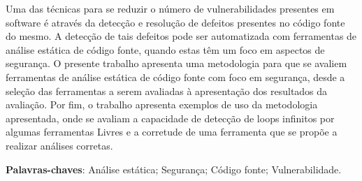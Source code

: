 \begin{resumo}

Uma das técnicas para se reduzir o número de vulnerabilidades presentes em
software é através da detecção e resolução de defeitos presentes no código fonte
do mesmo. A detecção de tais defeitos pode ser automatizada com ferramentas de
análise estática de código fonte, quando estas têm um foco em aspectos de
segurança. O presente trabalho apresenta uma metodologia para que se avaliem
ferramentas de análise estática de código fonte com foco em segurança, desde a
seleção das ferramentas a serem avaliadas à apresentação dos resultados da
avaliação. Por fim, o trabalho apresenta exemplos de uso da metodologia
apresentada, onde se avaliam a capacidade de detecção de loops infinitos por
algumas ferramentas Livres e a corretude de uma ferramenta que se propõe a
realizar análises corretas. 

 \vspace{\onelineskip}
    
 \noindent
 \textbf{Palavras-chaves}: Análise estática; Segurança; Código fonte; Vulnerabilidade.
\end{resumo}
